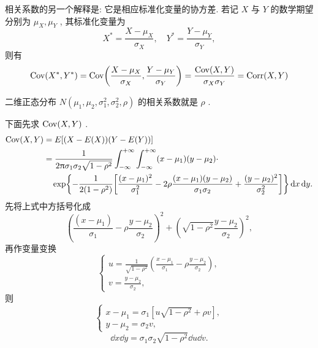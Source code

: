 	相关系数的另一个解释是: 它是相应标准化变量的协方差. 若记 $X$ 与 $Y$ 的数学期望分别为 $\mu_{X},\mu_{Y}$ , 其标准化变量为
	\begin{equation*}
		X^{*}=\frac{X-\mu_{X}}{\sigma_{X}},\quad Y^{*}=\frac{Y-\mu_{Y}}{\sigma_{Y}},
	\end{equation*}
	则有
	\begin{equation*}
		\Cov\left(X^{*}, Y^{*}\right)=\Cov\left(\frac{X-\mu_{X}}{\sigma_{X}}, \frac{Y-\mu_{Y}}{\sigma_{Y}}\right)=\frac{\Cov(X, Y)}{\sigma_{X}\sigma_{Y}}=\Corr(X, Y)
	\end{equation*}
	\begin{example}\label{exam:3.4.9}
		二维正态分布 $N\left(\mu_{1}, \mu_{2}, \sigma_{1}^{2}, \sigma_{2}^{2}, \rho\right)$ 的相关系数就是 $\rho$ .
		\begin{solution}
			下面先求 $\operatorname{Cov}(X,Y)$ .
			\begin{align*}
				\Cov(X,Y)&=E[ (X-E(X)) (Y-E(Y)) ]\\
				&=\frac{1}{2\uppi \sigma_1\sigma_2\sqrt{1-\rho^2}} \int_{-\infty}^{+\infty}\int_{-\infty}^{+\infty} (x-\mu_1)(y-\mu_2) \cdot \\
				&\quad\exp\left\{ -\frac{1}{2\left( 1-\rho^2 \right)  }\left[ \frac{(x-\mu_1)^2}{\sigma_1^2}-2\rho\frac{(x-\mu_1)(y-\mu_2)}{\sigma_1\sigma_2}+\frac{(y-\mu_2)^2}{\sigma_2^2} \right] \right\}\dd x \dd y.
			\end{align*}
			先将上式中方括号化成
			\begin{equation*}
				\left( \frac{(x-\mu_1)}{\sigma_1}-\rho\frac{y-\mu_2}{\sigma_2} \right)^2+\left( \sqrt{1-\rho^2}\frac{y-\mu_2}{\sigma_2} \right)^2,
			\end{equation*}
			再作变量变换
			\begin{equation*}
				\begin{cases}
					u=\frac{1}{\sqrt{1-\rho^2}}\left( \frac{x-\mu_1}{\sigma_1}-\rho\frac{y-\mu_2}{\sigma_2} \right),\\
					v=\frac{y-\mu_2}{\sigma_2},
				\end{cases}
			\end{equation*}
			则
			\begin{equation*}
				\begin{cases}
					x-\mu_1=\sigma_1\left[ u\sqrt{1-\rho^2}+\rho v \right],\\
					y-\mu_2=\sigma_2 v,
				\end{cases}
			\end{equation*}
			\begin{equation*}
				\dd x\dd y=\sigma_1 \sigma_2 \sqrt{1-\rho^2}\dd u\dd v.

\end{equation*}
\end{solution}
\end{example}
